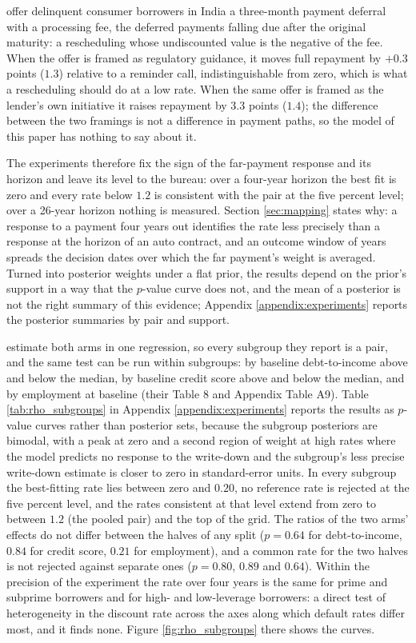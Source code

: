 \citet{fiorin_moratorium_2026} offer delinquent consumer borrowers in India a three-month payment deferral with a processing fee, the deferred payments falling due after the original maturity: a rescheduling whose undiscounted value is the negative of the fee. When the offer is framed as regulatory guidance, it moves full repayment by $+0.3$ points ($1.3$) relative to a reminder call, indistinguishable from zero, which is what a rescheduling should do at a low rate. When the same offer is framed as the lender's own initiative it raises repayment by $3.3$ points ($1.4$); the difference between the two framings is not a difference in payment paths, so the model of this paper has nothing to say about it.

The experiments therefore fix the sign of the far-payment response and its horizon and leave its level to the bureau: over a four-year horizon the best fit is zero and every rate below $1.2$ is consistent with the pair at the five percent level; over a 26-year horizon nothing is measured. Section \ref{sec:mapping} states why: a response to a payment four years out identifies the rate less precisely than a response at the horizon of an auto contract, and an outcome window of years spreads the decision dates over which the far payment's weight is averaged. Turned into posterior weights under a flat prior, the results depend on the prior's support in a way that the $p$-value curve does not, and the mean of a posterior is not the right summary of this evidence; Appendix \ref{appendix:experiments} reports the posterior summaries by pair and support.

\citet{dobbie_targeted_2020} estimate both arms in one regression, so every subgroup they report is a pair, and the same test can be run within subgroups: by baseline debt-to-income above and below the median, by baseline credit score above and below the median, and by employment at baseline (their Table 8 and Appendix Table A9). Table \ref{tab:rho_subgroups} in Appendix \ref{appendix:experiments} reports the results as $p$-value curves rather than posterior sets, because the subgroup posteriors are bimodal, with a peak at zero and a second region of weight at high rates where the model predicts no response to the write-down and the subgroup's less precise write-down estimate is closer to zero in standard-error units. In every subgroup the best-fitting rate lies between zero and $0.20$, no reference rate is rejected at the five percent level, and the rates consistent at that level extend from zero to between $1.2$ (the pooled pair) and the top of the grid. The ratios of the two arms' effects do not differ between the halves of any split ($p = 0.64$ for debt-to-income, $0.84$ for credit score, $0.21$ for employment), and a common rate for the two halves is not rejected against separate ones ($p = 0.80$, $0.89$ and $0.64$). Within the precision of the experiment the rate over four years is the same for prime and subprime borrowers and for high- and low-leverage borrowers: a direct test of heterogeneity in the discount rate across the axes along which default rates differ most, and it finds none. Figure \ref{fig:rho_subgroups} there shows the curves.



